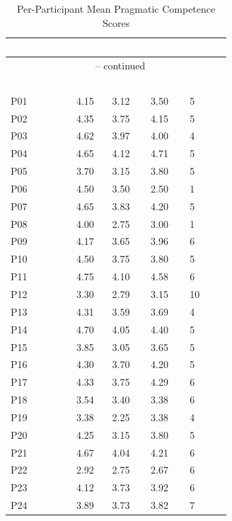 \begin{longtable}{p{2.5cm} p{2cm} p{2cm} p{2cm} p{2.5cm}}
\caption{Per-Participant Mean Pragmatic Competence Scores}
\label{tab:per-participant-means} \\

\rowcolor{headerblue}
\textcolor{white}{\textbf{Participant}} &
\textcolor{white}{\textbf{IC $M$}} &
\textcolor{white}{\textbf{SN $M$}} &
\textcolor{white}{\textbf{CE $M$}} &
\textcolor{white}{\textbf{$N_{\text{sessions}}$}} \\
\endfirsthead
\multicolumn{5}{c}{\tablename\ \thetable{} -- continued} \\
\rowcolor{headerblue}
\textcolor{white}{\textbf{Participant}} &
\textcolor{white}{\textbf{IC $M$}} &
\textcolor{white}{\textbf{SN $M$}} &
\textcolor{white}{\textbf{CE $M$}} &
\textcolor{white}{\textbf{$N_{\text{sessions}}$}} \\
\endhead

\midrule
P01 & 4.15 & 3.12 & 3.50 & 5  \\
\midrule
P02 & 4.35 & 3.75 & 4.15 & 5  \\
\midrule
P03 & 4.62 & 3.97 & 4.00 & 4  \\
\midrule
P04 & 4.65 & 4.12 & 4.71 & 5  \\
\midrule
P05 & 3.70 & 3.15 & 3.80 & 5  \\
\midrule
P06 & 4.50 & 3.50 & 2.50 & 1  \\
\midrule
P07 & 4.65 & 3.83 & 4.20 & 5  \\
\midrule
P08 & 4.00 & 2.75 & 3.00 & 1  \\
\midrule
P09 & 4.17 & 3.65 & 3.96 & 6  \\
\midrule
P10 & 4.50 & 3.75 & 3.80 & 5  \\
\midrule
P11 & 4.75 & 4.10 & 4.58 & 6  \\
\midrule
P12 & 3.30 & 2.79 & 3.15 & 10 \\
\midrule
P13 & 4.31 & 3.59 & 3.69 & 4  \\
\midrule
P14 & 4.70 & 4.05 & 4.40 & 5  \\
\midrule
P15 & 3.85 & 3.05 & 3.65 & 5  \\
\midrule
P16 & 4.30 & 3.70 & 4.20 & 5  \\
\midrule
P17 & 4.33 & 3.75 & 4.29 & 6  \\
\midrule
P18 & 3.54 & 3.40 & 3.38 & 6  \\
\midrule
P19 & 3.38 & 2.25 & 3.38 & 4  \\
\midrule
P20 & 4.25 & 3.15 & 3.80 & 5  \\
\midrule
P21 & 4.67 & 4.04 & 4.21 & 6  \\
\midrule
P22 & 2.92 & 2.75 & 2.67 & 6  \\
\midrule
P23 & 4.12 & 3.73 & 3.92 & 6  \\
\midrule
P24 & 3.89 & 3.73 & 3.82 & 7  \\
\bottomrule
\end{longtable}


